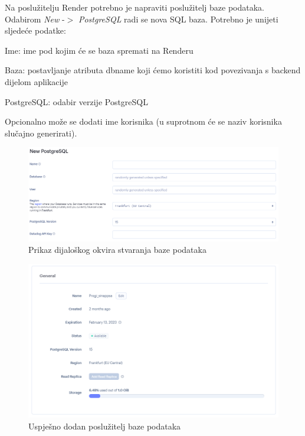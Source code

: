 			Na poslužitelju Render potrebno je napraviti poslužitelj baze podataka. Odabirom \textit{New} -$>$ \textit{PostgreSQL} radi se nova SQL baza. Potrebno je unijeti sljedeće podatke:
			\begin{packed_item}
				\item Ime: ime pod kojim će se baza spremati na Renderu
				\item Baza: postavljanje atributa dbname koji ćemo koristiti kod povezivanja s backend dijelom aplikacije
				\item PostgreSQL: odabir verzije PostgreSQL
			\end{packed_item}
			Opcionalno može se dodati ime korisnika (u suprotnom će se naziv korisnika slučajno generirati).
			\begin{figure}[H]
				\includegraphics[scale=0.5]{slike/slika1.png}
				\centering
				\caption{Prikaz dijaloškog okvira stvaranja baze podataka}
				\label{fig:dij okvir}
			\end{figure}
			\begin{figure}[H]
				\includegraphics[scale=0.45]{slike/slika2.png}
				\centering
				\caption{Uspješno dodan poslužitelj baze podataka}
				\label{fig:uspj dodan}
			\end{figure}
			
